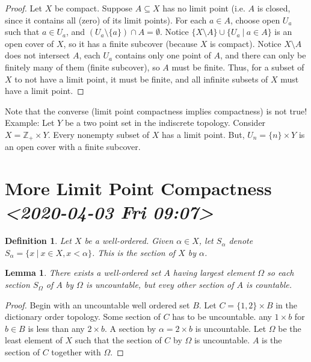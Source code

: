\documentclass[11pt]{article}
\newtheorem{lemma}{Lemma}[section]
\newtheorem{definition}{Definition}[section]
\begin{document}
\begin{proof}
Let \(X\) be compact. Suppose \(A\subseteq X\) has no limit point (i.e. \(A\) is
closed, since it contains all (zero) of its limit points). For each \(a\in A\),
choose open \(U_a\) such that \(a\in U_a\), and \((U_a\setminus \{a\})\cap A =
\emptyset\). Notice \(\{X\setminus A\}\cup\{U_a\ |\ a\in A\}\) is an open cover of
\(X\), so it has a finite subcover (because \(X\) is compact). Notice \(X\setminus A\)
does not intersect \(A\), each \(U_a\) contains only one point of \(A\), and there can
only be finitely many of them (finite subcover), so \(A\) must be finite. Thus,
for a subset of \(X\) to not have a limit point, it must be finite, and all
infinite subsets of \(X\) must have a limit point.      
\end{proof}

Note that the converse (limit point compactness implies compactness) is not
true! Example: Let \(Y\) be a two point set in the indiscrete topology. Consider
\(X = \mathbb{Z}_+\times Y\). Every nonempty subset of \(X\) has a limit point. But,
\(U_n = \{n\}\times Y\) is an open cover with a finite subcover. 
\section{More Limit Point Compactness \textit{<2020-04-03 Fri 09:07>}}
\label{sec:orgf5b802a}
\begin{definition}
Let \(X\) be a well-ordered. Given \(\alpha\in X\), let \(S_{\alpha}\) denote
\(S_{\alpha} = \{ x\ |\ x\in X, x < \alpha\}\). This is the section of \(X\) by
\(\alpha\).
\end{definition}

\begin{lemma}
There exists a well-ordered set \(A\) having largest element \(\Omega\) so each
section \(S_{\Omega}\) of \(A\) by \(\Omega\) is uncountable, but evey other section of
\(A\) is countable. 
\end{lemma}

\begin{proof}
Begin with an uncountable well ordered set \(B\). Let \(C = \{1,2\}\times B\) in the
dictionary order topology. Some section of \(C\) has to be uncountable. any
\(1\times b\) for \(b\in B\) is less than any \(2\times b\). A section by \(\alpha =
2\times b\) is uncountable. 
Let \(\Omega\) be the least element of \(X\) such that the section of \(C\) by \(\Omega\) is
uncountable. \(A\) is the section of \(C\) together with \(\Omega\).  
\end{proof}
\end{document}
